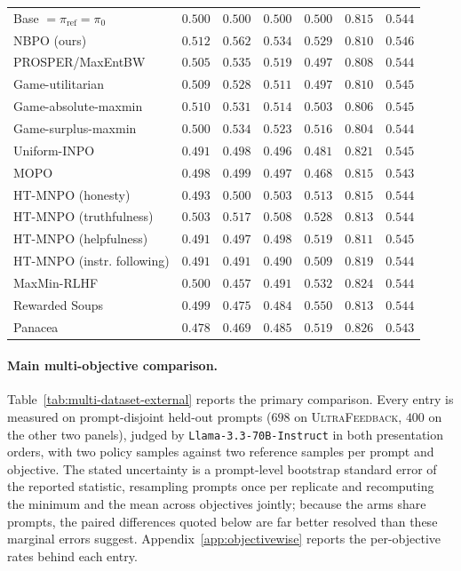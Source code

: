 \documentclass{article}
\theoremstyle{remark}
\theoremstyle{plain}
\newcommand{\piref}{\pi_{\mathrm{ref}}}
\newcommand{\NBPO}{\textsc{NBPO}}
\begin{document}
\begin{table}[t]
\begin{tabular}{lrrrrrr}
Base $=\piref=\pi_0$ & $0.500$ & $0.500$ & $0.500$ & $0.500$ & $0.815$ & $0.544$\\
\NBPO{} (ours) & $\mathbf{0.512}$ & $\mathbf{0.562}$ & $\mathbf{0.534}$ & $0.529$ & $0.810$ & $\mathbf{0.546}$\\
PROSPER/MaxEntBW & $0.505$ & $0.535$ & $0.519$ & $0.497$ & $0.808$ & $0.544$\\
Game-utilitarian & $0.509$ & $0.528$ & $0.511$ & $0.497$ & $0.810$ & $0.545$\\
Game-absolute-maxmin & $0.510$ & $0.531$ & $0.514$ & $0.503$ & $0.806$ & $0.545$\\
Game-surplus-maxmin & $0.500$ & $0.534$ & $0.523$ & $0.516$ & $0.804$ & $0.544$\\
Uniform-INPO & $0.491$ & $0.498$ & $0.496$ & $0.481$ & $0.821$ & $0.545$\\
MOPO & $0.498$ & $0.499$ & $0.497$ & $0.468$ & $0.815$ & $0.543$\\
HT-MNPO (honesty) & $0.493$ & $0.500$ & $0.503$ & $0.513$ & $0.815$ & $0.544$\\
HT-MNPO (truthfulness) & $0.503$ & $0.517$ & $0.508$ & $0.528$ & $0.813$ & $0.544$\\
HT-MNPO (helpfulness) & $0.491$ & $0.497$ & $0.498$ & $0.519$ & $0.811$ & $0.545$\\
HT-MNPO (instr. following) & $0.491$ & $0.491$ & $0.490$ & $0.509$ & $0.819$ & $0.544$\\
\addlinespace
MaxMin-RLHF & $0.500$ & $0.457$ & $0.491$ & $0.532$ & $0.824$ & $0.544$\\
Rewarded Soups & $0.499$ & $0.475$ & $0.484$ & $\mathbf{0.550}$ & $0.813$ & $0.544$\\
Panacea & $0.478$ & $0.469$ & $0.485$ & $0.519$ & $\mathbf{0.826}$ & $0.543$\\
\bottomrule
\end{tabular}
\end{table}

\paragraph{Main multi-objective comparison.}
Table~\ref{tab:multi-dataset-external} reports the primary comparison. Every entry is measured on
prompt-disjoint held-out prompts ($698$ on \textsc{UltraFeedback}, $400$ on the other two panels),
judged by \texttt{Llama-3.3-70B-Instruct} in both presentation orders, with two policy samples
against two reference samples per prompt and objective. The stated uncertainty is a prompt-level
bootstrap standard error of the reported statistic, resampling prompts once per replicate and
recomputing the minimum and the mean across objectives jointly; because the arms share prompts, the
paired differences quoted below are far better resolved than these marginal errors suggest.
Appendix~\ref{app:objectivewise} reports the per-objective rates behind each entry.
\end{document}
